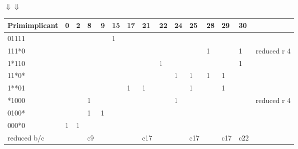 \documentclass[10pt,a4paper]{scrartcl}
\begin{document}
\hspace*{3cm}$\Downarrow$\hspace*{3cm}$\Downarrow$\\
\hspace*{3.5mm}
\begin{tabular}{|l||l|l|l|l|l|l|l|l|l|l|l|l|l|l|}\hline
Primimplicant & 0 & 2 & \cellcolor{gray}8 & 9 & 15 & 17 & \cellcolor{gray}21 & 22 & 24 & \cellcolor{gray}25 & 28 & \cellcolor{gray}29 & \cellcolor{gray}30 &  \\\hline\hline
 01111        &   &   & \cellcolor{gray}  &   & 1  &    & \cellcolor{gray}   &    &    & \cellcolor{gray}   &    & \cellcolor{gray}   & \cellcolor{gray}   & \\\hline
 \cellcolor{gray}111*0        & \cellcolor{gray}  & \cellcolor{gray}  & \cellcolor{gray}  & \cellcolor{gray}  & \cellcolor{gray}   & \cellcolor{gray}   & \cellcolor{gray}   & \cellcolor{gray}   &  \cellcolor{gray}  & \cellcolor{gray}   & \cellcolor{gray}1  & \cellcolor{gray}   & \cellcolor{gray}1  & reduced r 4\\ \hline
 1*110        &   &   & \cellcolor{gray}  &   &    &    & \cellcolor{gray}   & 1  &    & \cellcolor{gray}   &    & \cellcolor{gray}   & \cellcolor{gray}1  & \\
 11*0*        &   &   & \cellcolor{gray}  &   &    &    & \cellcolor{gray}   &    & 1  & \cellcolor{gray}1  & 1  & \cellcolor{gray}1  & \cellcolor{gray}   & \\
 1**01        &   &   & \cellcolor{gray}  &   &    & 1  & \cellcolor{gray}1  &    &    & \cellcolor{gray}1  &    & \cellcolor{gray}1  & \cellcolor{gray}   & \\  \hline
 \cellcolor{gray}*1000        & \cellcolor{gray}  & \cellcolor{gray}  & \cellcolor{gray}1 &  \cellcolor{gray} & \cellcolor{gray}   & \cellcolor{gray}   & \cellcolor{gray}   & \cellcolor{gray}   & \cellcolor{gray}1  & \cellcolor{gray}   & \cellcolor{gray}   & \cellcolor{gray}   & \cellcolor{gray}   & reduced r 4\\  \hline
 0100*        &   &   & \cellcolor{gray}1 & 1 &    &    & \cellcolor{gray}   &    &    & \cellcolor{gray}   &    & \cellcolor{gray}   & \cellcolor{gray}   & \\
 000*0        & 1 & 1 & \cellcolor{gray}  &   &    &    & \cellcolor{gray}   &    &    & \cellcolor{gray}   &    & \cellcolor{gray}   & \cellcolor{gray}   & \\ \hline
 reduced b/c  &   &   & c9                &   &    &    & c17                &    &    & c17                &    & c17                & c22                & \\ \hline
\end{tabular}
\end{document}
